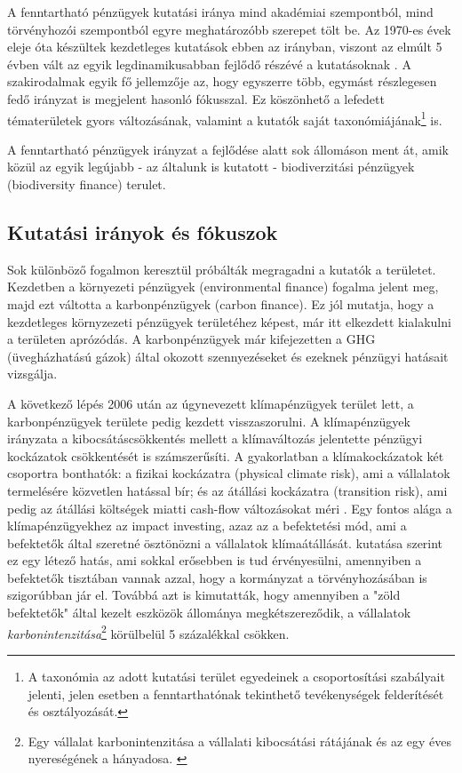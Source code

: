 A fenntartható pénzügyek kutatási iránya mind akadémiai szempontból, mind törvényhozói szempontból egyre meghatározóbb szerepet tölt be. Az 1970-es évek eleje óta készültek kezdetleges kutatások ebben az irányban, viszont az elmúlt 5 évben vált az egyik legdinamikusabban fejlődő részévé a kutatásoknak . A szakirodalmak egyik fő jellemzője az, hogy egyszerre több, egymást részlegesen fedő irányzat is megjelent hasonló fókusszal. Ez köszönhető a lefedett tématerületek gyors változásának, valamint a kutatók saját taxonómiájának\footnote{A taxonómia az adott kutatási terület egyedeinek a csoportosítási szabályait jelenti, jelen esetben a fenntarthatónak tekinthető tevékenységek felderítését és osztályozását.} is. \parencite{sarvari_fenntarthato_2026}

A fenntartható pénzügyek irányzat a fejlődése alatt sok állomáson ment át, amik közül az egyik legújabb - az általunk is kutatott - biodiverzitási pénzügyek (biodiversity finance) terulet. \parencite{karolyi_biodiversity_2023}

\subsection{Kutatási irányok és fókuszok}

Sok különböző fogalmon keresztül próbálták megragadni a kutatók a területet. Kezdetben a környezeti pénzügyek (environmental finance) fogalma jelent meg, majd ezt váltotta a karbonpénzügyek (carbon finance). Ez jól mutatja, hogy a kezdetleges környzezeti pénzügyek területéhez képest,  már itt elkezdett kialakulni a területen aprózódás. A karbonpénzügyek már kifejezetten a GHG (üvegházhatású gázok) által okozott szennyezéseket és ezeknek pénzügyi hatásait vizsgálja.

A következő lépés 2006 után az úgynevezett klímapénzügyek terület lett, a karbonpénzügyek területe pedig kezdett visszaszorulni. A klímapénzügyek irányzata a kibocsátáscsökkentés mellett a klímaváltozás jelentette pénzügyi kockázatok csökkentését is számszerűsíti. A gyakorlatban a klímakockázatok két csoportra bonthatók: a fizikai kockázatra (physical climate risk), ami a vállalatok termelésére közvetlen hatással bír; és az átállási kockázatra (transition risk), ami pedig az átállási költségek miatti cash-flow változásokat méri \parencite{giglio_climate_2021}. Egy fontos alága a klímapénzügyekhez az impact investing, azaz az a befektetési mód, ami a befektetők által szeretné ösztönözni a vállalatok klímaátállását. \textcite{de_angelis_climate_2021} kutatása szerint ez egy létező hatás, ami sokkal erősebben is tud érvényesülni, amennyiben a befektetők tisztában vannak azzal, hogy a kormányzat a törvényhozásában is szigorúbban jár el. Továbbá azt is kimutatták, hogy amennyiben a "zöld befektetők" által kezelt eszközök állománya megkétszereződik, a vállalatok \textit{karbonintenzitása}\footnote{Egy vállalat karbonintenzitása a vállalati kibocsátási rátájának és az egy éves nyereségének a hányadosa. \parencite{de_angelis_climate_2021}} körülbelül 5 százalékkal csökken.

